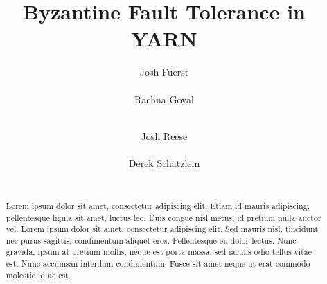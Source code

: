 \documentclass{sig-alternate}
\begin{document}
\title{Byzantine Fault Tolerance in YARN}

%
%

%
\author{
%
%
\alignauthor
Josh Fuerst\\
       \\
\alignauthor
Rachna Goyal\\
       \\
\and 
\alignauthor 
Josh Reese\\
       \\
\alignauthor 
Derek Schatzlein\\
       \\
}

\maketitle

\begin{abstract}
Lorem ipsum dolor sit amet, consectetur adipiscing elit. Etiam id mauris adipiscing, pellentesque ligula sit amet, luctus leo. 
Duis congue nisl metus, id pretium nulla auctor vel. Lorem ipsum dolor sit amet, consectetur adipiscing elit. Sed mauris nisl, 
tincidunt nec purus sagittis, condimentum aliquet eros. Pellentesque eu dolor lectus. Nunc gravida, ipsum at pretium mollis, neque 
est porta massa, sed iaculis odio tellus vitae est. Nunc accumsan interdum condimentum. Fusce sit amet neque ut erat commodo molestie id ac est.
\end{abstract}
\end{document}
